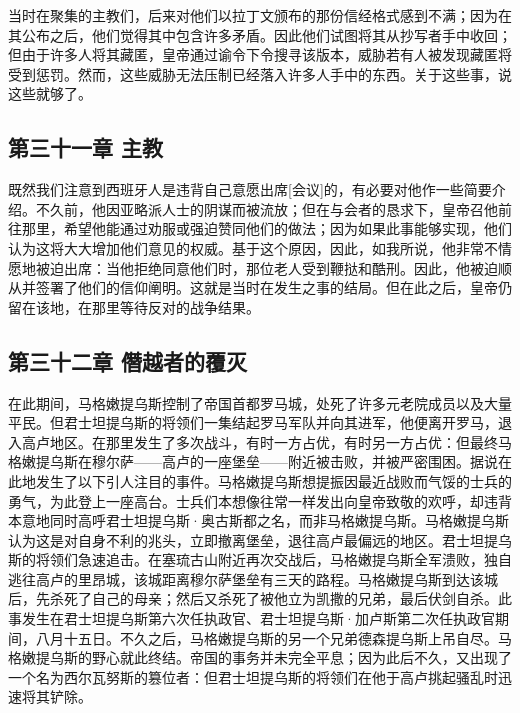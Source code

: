 当时在聚集的主教们，后来对他们以拉丁文颁布的那份信经格式感到不满；因为在其公布之后，他们觉得其中包含许多矛盾。因此他们试图将其从抄写者手中收回；但由于许多人将其藏匿，皇帝通过谕令下令搜寻该版本，威胁若有人被发现藏匿将受到惩罚。然而，这些威胁无法压制已经落入许多人手中的东西。关于这些事，说这些就够了。\par


\subsection{第三十一章 主教}

既然我们注意到西班牙人是违背自己意愿出席[会议]的，有必要对他作一些简要介绍。不久前，他因亚略派人士的阴谋而被流放；但在与会者的恳求下，皇帝召他前往那里，希望他能通过劝服或强迫赞同他们的做法；因为如果此事能够实现，他们认为这将大大增加他们意见的权威。基于这个原因，因此，如我所说，他非常不情愿地被迫出席：当他拒绝同意他们时，那位老人受到鞭挞和酷刑。因此，他被迫顺从并签署了他们的信仰阐明。这就是当时在发生之事的结局。但在此之后，皇帝仍留在该地，在那里等待反对的战争结果。\par


\subsection{第三十二章 僭越者的覆灭}

在此期间，马格嫩提乌斯控制了帝国首都罗马城，处死了许多元老院成员以及大量平民。但君士坦提乌斯的将领们一集结起罗马军队并向其进军，他便离开罗马，退入高卢地区。在那里发生了多次战斗，有时一方占优，有时另一方占优：但最终马格嫩提乌斯在穆尔萨——高卢的一座堡垒——附近被击败，并被严密围困。据说在此地发生了以下引人注目的事件。马格嫩提乌斯想提振因最近战败而气馁的士兵的勇气，为此登上一座高台。士兵们本想像往常一样发出向皇帝致敬的欢呼，却违背本意地同时高呼君士坦提乌斯·奥古斯都之名，而非马格嫩提乌斯。马格嫩提乌斯认为这是对自身不利的兆头，立即撤离堡垒，退往高卢最偏远的地区。君士坦提乌斯的将领们急速追击。在塞琉古山附近再次交战后，马格嫩提乌斯全军溃败，独自逃往高卢的里昂城，该城距离穆尔萨堡垒有三天的路程。马格嫩提乌斯到达该城后，先杀死了自己的母亲；然后又杀死了被他立为凯撒的兄弟，最后伏剑自杀。此事发生在君士坦提乌斯第六次任执政官、君士坦提乌斯·加卢斯第二次任执政官期间，八月十五日。不久之后，马格嫩提乌斯的另一个兄弟德森提乌斯上吊自尽。马格嫩提乌斯的野心就此终结。帝国的事务并未完全平息；因为此后不久，又出现了一个名为西尔瓦努斯的篡位者：但君士坦提乌斯的将领们在他于高卢挑起骚乱时迅速将其铲除。\par

